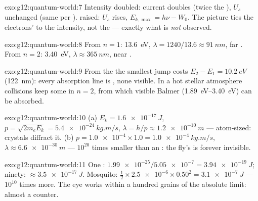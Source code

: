 \begin{solution}{exo:g12:quantum-world:7}
Intensity doubled: current doubles (twice the ), $U_s$
unchanged (same  per ).  raised: $U_s$ rises,
$E_{k,\max} = h\nu - W_0$. The  picture ties the electrons' 
to the intensity, not the  --- exactly what is \emph{not}
observed.
\end{solution}

\begin{solution}{exo:g12:quantum-world:8}
From $n = 1$: \qty{13.6}{eV}, $\lambda = 1240/13.6 \approx
\qty{91}{nm}$, far . From $n = 2$: \qty{3.40}{eV},
$\lambda \approx \qty{365}{nm}$, near .
\end{solution}

\begin{solution}{exo:g12:quantum-world:9}
From the  the smallest jump costs $E_2 - E_1 =
\qty{10.2}{eV}$ (\qty{122}{nm}): every absorption line is
, none visible. In a hot stellar atmosphere collisions keep
some  in $n = 2$, from which visible Balmer 
(\qtyrange{1.89}{3.40}{eV}) can be absorbed.
\end{solution}

\begin{solution}{exo:g12:quantum-world:10}
(a) $E_k = \qty{1.6e-17}{J}$, $p = \sqrt{2m_e E_k} =
\qty{5.4e-24}{kg.m/s}$, $\lambda = h/p \approx \qty{1.2e-10}{m}$ ---
atom-sized: crystals diffract it. (b) $p = \num{1.0e-4} \times 1.0 =
\qty{1.0e-4}{kg.m/s}$, $\lambda \approx \qty{6.6e-30}{m}$ --- $10^{20}$
times smaller than an : the fly's  is forever invisible.
\end{solution}

\begin{solution}{exo:g12:quantum-world:11}
One : $\num{1.99e-25}/\num{5.05e-7} = \qty{3.94e-19}{J}$; ninety:
$\approx \qty{3.5e-17}{J}$. Mosquito: $\tfrac12 \times \num{2.5e-6}
\times 0.50^2 = \qty{3.1e-7}{J}$ --- $10^{10}$ times more. The eye
works within a hundred grains of the absolute limit: almost a 
counter.
\end{solution}

